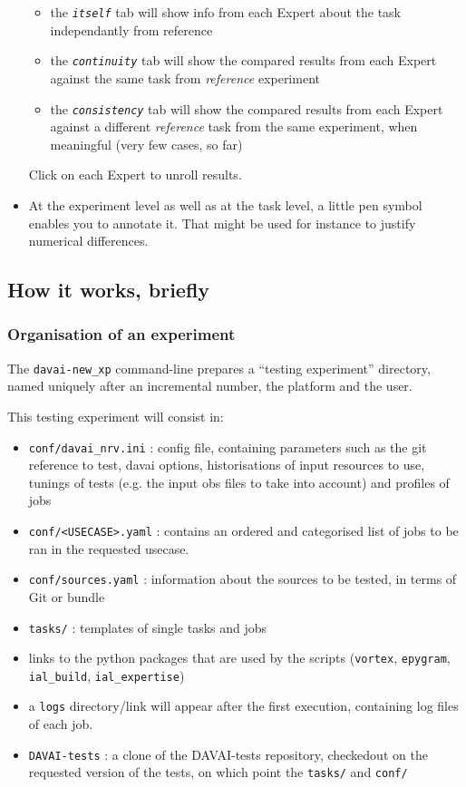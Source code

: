 \documentclass[a4paper,10pt,twoside]{article}
\begin{document}
\begin{itemize}
 \begin{itemize}
  \item the \textit{\texttt{itself}} tab will show info from each Expert about the task independantly from reference
  \item the \textit{\texttt{continuity}} tab will show the compared results from each Expert against the same task from \textit{reference} experiment
  \item the \textit{\texttt{consistency}} tab will show the compared results from each Expert against a different \textit{reference} task from the same experiment, when meaningful (very few cases, so far)
 \end{itemize}
 Click on each Expert to unroll results.
 \item At the experiment level as well as at the task level, a little pen symbol enables you to annotate it. That might be used for instance to justify numerical differences.
\end{itemize}





\newpage
\subsection{How it works, briefly}
\subsubsection{Organisation of an experiment}
The \texttt{davai-new\_xp} command-line prepares a ``testing experiment'' directory, named uniquely after an incremental number, the platform and the user.

\noindent This testing experiment will consist in:
\begin{itemize}
 \item \texttt{conf/davai\_nrv.ini} : config file, containing parameters such as the git reference to test, davai options, historisations of input resources to use, tunings of tests (e.g. the input obs files to take into account) and profiles of jobs
 \item \texttt{conf/<USECASE>.yaml} : contains an ordered and categorised list of jobs to be ran in the requested usecase.
 \item \texttt{conf/sources.yaml} : information about the sources to be tested, in terms of Git or bundle
 \item \texttt{tasks/} : templates of single tasks and jobs
 \item links to the python packages that are used by the scripts (\texttt{vortex}, \texttt{epygram}, \texttt{ial\_build}, \texttt{ial\_expertise})
 \item a \texttt{logs} directory/link will appear after the first execution, containing log files of each job.
 \item \texttt{DAVAI-tests} : a clone of the DAVAI-tests repository, checkedout on the requested version of the tests, on which point the \texttt{tasks/} and \texttt{conf/}
\end{itemize}
\end{document}
